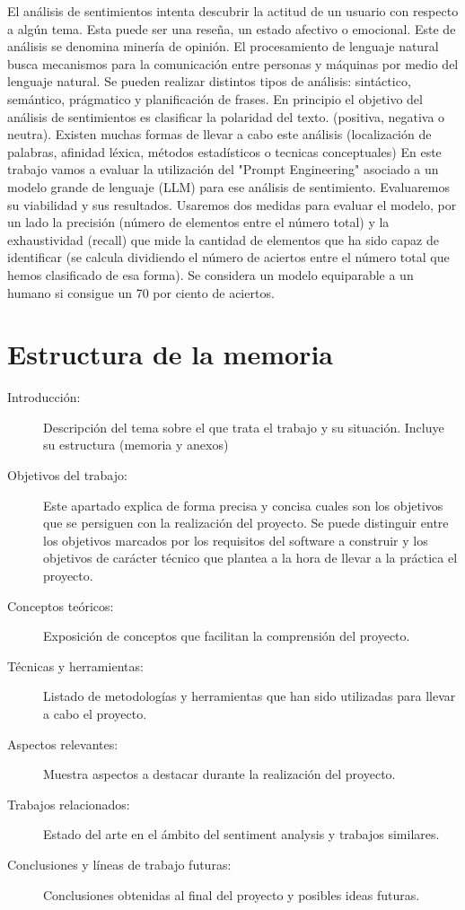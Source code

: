 
El análisis de sentimientos intenta descubrir la actitud de un usuario 
con respecto a algún tema.
Esta puede ser una reseña, un estado afectivo o emocional. 
Este de análisis se denomina minería de opinión.
El procesamiento de lenguaje natural busca mecanismos 
para la comunicación entre personas y máquinas por medio del
lenguaje natural. 
Se pueden realizar distintos tipos de análisis: 
sintáctico, semántico, prágmatico y planificación de frases.
En principio el objetivo del análisis de sentimientos es 
clasificar la polaridad del texto. (positiva, negativa o neutra).
Existen muchas formas de llevar a cabo este análisis (localización de palabras, 
afinidad léxica, métodos estadísticos o tecnicas conceptuales)
En este trabajo vamos a evaluar la utilización del "Prompt Engineering" 
asociado a un modelo grande de lenguaje (LLM) para ese análisis de sentimiento.
Evaluaremos su viabilidad y sus resultados. 
Usaremos dos medidas para evaluar el modelo, 
por un lado la precisión (número de elementos entre el número total) 
y la exhaustividad (recall) que mide la cantidad de elementos 
que ha sido capaz de identificar 
(se calcula dividiendo el número de aciertos entre el número 
total que hemos clasificado de esa forma). 
Se considera un modelo equiparable a un humano si consigue un 70 por ciento de aciertos.

\section{Estructura de la memoria}
\begin{description}
	\item[Introducción:] Descripción del tema sobre el que trata el trabajo y su situación. Incluye su estructura (memoria y anexos)
	\item[Objetivos del trabajo:] Este apartado explica de forma precisa y concisa cuales son los objetivos que se persiguen con la realización del proyecto. Se puede distinguir entre los objetivos marcados por los requisitos del software a construir y los objetivos de carácter técnico que plantea a la hora de llevar a la práctica el proyecto.
    \item[Conceptos teóricos:] Exposición de conceptos que facilitan la comprensión del proyecto.
    \item[Técnicas y herramientas:] Listado de metodologías y herramientas que han sido utilizadas para llevar a cabo el proyecto.
    \item[Aspectos relevantes:] Muestra aspectos a destacar durante la realización del proyecto.
    \item[Trabajos relacionados:] Estado del arte en el ámbito del sentiment analysis y trabajos similares.
    \item[Conclusiones y líneas de trabajo futuras:] Conclusiones obtenidas al final del proyecto y posibles ideas futuras.
\end{description}
